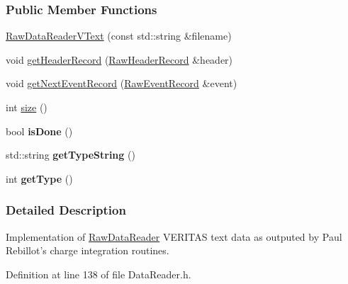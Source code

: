 \subsubsection*{Public Member Functions}
\begin{DoxyCompactItemize}
\item 
\hypertarget{classRawDataReaderVText_a88870b1f83b0348a399052fea589c9df}{
\hyperlink{classRawDataReaderVText_a88870b1f83b0348a399052fea589c9df}{RawDataReaderVText} (const std::string \&filename)}
\label{classRawDataReaderVText_a88870b1f83b0348a399052fea589c9df}

\item 
void \hyperlink{classRawDataReaderVText_a7fb3e50fa41df971c06c1b424c713675}{getHeaderRecord} (\hyperlink{structRawHeaderRecord}{RawHeaderRecord} \&header)
\item 
void \hyperlink{classRawDataReaderVText_aba47308e73a41331cff56a3b38109a17}{getNextEventRecord} (\hyperlink{structRawEventRecord}{RawEventRecord} \&event)
\item 
\hypertarget{classRawDataReaderVText_adca172216ac8835629493b3c5845f952}{
int \hyperlink{classRawDataReaderVText_adca172216ac8835629493b3c5845f952}{size} ()}
\label{classRawDataReaderVText_adca172216ac8835629493b3c5845f952}

\item 
\hypertarget{classRawDataReaderVText_a7049b224eb00a191a520070ae4558521}{
bool {\bfseries isDone} ()}
\label{classRawDataReaderVText_a7049b224eb00a191a520070ae4558521}

\item 
\hypertarget{classRawDataReaderVText_a7e68f833fba61cb69358cb751b83a2bf}{
std::string {\bfseries getTypeString} ()}
\label{classRawDataReaderVText_a7e68f833fba61cb69358cb751b83a2bf}

\item 
\hypertarget{classRawDataReaderVText_adaa1bd5162aeaa1430036dd84981051f}{
int {\bfseries getType} ()}
\label{classRawDataReaderVText_adaa1bd5162aeaa1430036dd84981051f}

\end{DoxyCompactItemize}


\subsubsection{Detailed Description}
Implementation of \hyperlink{classRawDataReader}{RawDataReader} VERITAS text data as outputed by Paul Rebillot's charge integration routines. 

Definition at line 138 of file DataReader.h.



